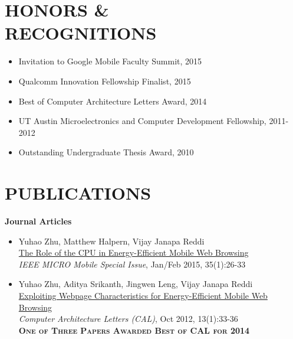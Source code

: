\documentclass[margin, 9pt]{res} %
\begin{document}
\begin{resume}
 
\section{HONORS \&\\ RECOGNITIONS}

\vspace*{-1pt}
\begin{itemize}[leftmargin=*] \itemsep -4pt
	\item Invitation to Google Mobile Faculty Summit, 2015
	\item Qualcomm Innovation Fellowship Finalist, 2015
	\item Best of Computer Architecture Letters Award, 2014
	\item UT Austin Microelectronics and Computer Development Fellowship, 2011-2012
	\item Outstanding Undergraduate Thesis Award, 2010
\end{itemize}

 
\section{PUBLICATIONS}

{\large\textbf{Journal Articles}}

\begin{itemize}[leftmargin=*] \itemsep 0pt
	\item Yuhao Zhu, Matthew Halpern, Vijay Janapa Reddi\\
          \href{http://yuhaozhu.com/pubs/ieeemicro15.pdf}{The Role of the CPU in Energy-Efficient Mobile Web Browsing}\\
          \textit{IEEE MICRO Mobile Special Issue}, Jan/Feb 2015, 35(1):26-33

	\item Yuhao Zhu, Aditya Srikanth, Jingwen Leng, Vijay Janapa Reddi\\
          \href{http://yuhaozhu.com/pubs/cal12.pdf}{Exploiting Webpage Characteristics for Energy-Efficient Mobile Web Browsing}\\
          \textit{Computer Architecture Letters (CAL)}, Oct 2012, 13(1):33-36\\
          \textbf{\textsc{One of Three Papers Awarded Best of CAL for 2014}}


\end{itemize}
\end{resume}
\end{document}
